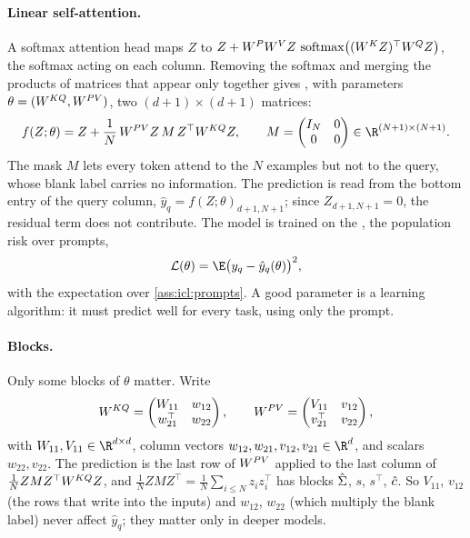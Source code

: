 \begin{refsection}
\paragraph{Linear self-attention.} A softmax attention head \parencite{VaswaniEtAl2017} maps $Z$ to $Z+W^PW^VZ\,\operatorname{softmax}\bigl((W^KZ)^\top W^QZ\bigr)$, the softmax acting on each column. Removing the softmax and merging the products of matrices that appear only together gives  \parencite{SchlagEtAl2021,VonOswaldEtAl2023}, with parameters $\theta=(W^{KQ},W^{PV})$, two $(d+1)\times(d+1)$ matrices:
\begin{equation}\label{eq:icl:lsa}
  f(Z;\theta)=Z+\frac1N\,\iclPV Z\,M\,Z^\top\iclKQ Z,\qquad M=\begin{pmatrix}I_N&0\\0&0\end{pmatrix}\in\R^{(N+1)\times(N+1)} .
\end{equation}
The mask $M$ lets every token attend to the $N$ examples but not to the query, whose blank label carries no information. The prediction is read from the bottom entry of the query column, $\hat y_q=f(Z;\theta)_{d+1,N+1}$; since $Z_{d+1,N+1}=0$, the residual term does not contribute. The model is trained on the , the population risk over prompts,
\[
  \Loss(\theta)=\E\bigl(y_q-\hat y_q(\theta)\bigr)^2 ,
\]
with the expectation over \cref{ass:icl:prompts}. A good parameter is a learning algorithm: it must predict well for every task, using only the prompt.

\paragraph{Blocks.} Only some blocks of $\theta$ matter. Write
\[
  W^{KQ}=\begin{pmatrix}W_{11}&w_{12}\\ w_{21}^\top&w_{22}\end{pmatrix},\qquad
  W^{PV}=\begin{pmatrix}V_{11}&v_{12}\\ v_{21}^\top&v_{22}\end{pmatrix},
\]
with $W_{11},V_{11}\in\R^{d\times d}$, column vectors $w_{12},w_{21},v_{12},v_{21}\in\R^d$, and scalars $w_{22},v_{22}$. The prediction is the last row of $W^{PV}$ applied to the last column of $\frac1NZMZ^\top W^{KQ} Z$, and $\frac1NZMZ^\top=\frac1N\sum_{i\le N}z_iz_i^\top$ has blocks $\hat\Sigma$, $s$, $s^\top$, $\hat c$. So $V_{11}$, $v_{12}$ (the rows that write into the inputs) and $w_{12}$, $w_{22}$ (which multiply the blank label) never affect $\hat y_q$; they matter only in deeper models.


\end{refsection}
